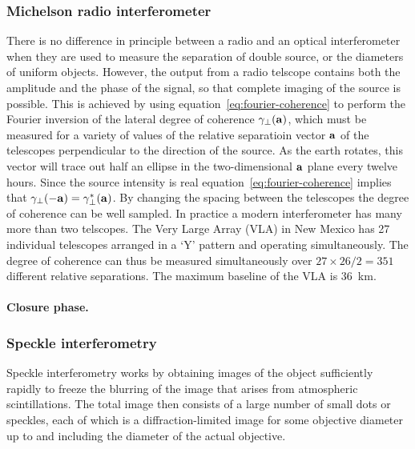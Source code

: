 \subsubsection{Michelson radio interferometer}

There is no difference in principle between a radio and an optical interferometer when they are used to measure the separation of double source, or the diameters of uniform objects. However, the output from a radio telscope contains both the amplitude and the phase of the signal, so that complete imaging of the source is possible. This is achieved by using equation~\ref{eq:fourier-coherence} to perform the Fourier inversion of the lateral degree of coherence $\gamma_\perp({\bf a})$, which must be measured for a 
variety of values of the relative separatioin vector ${\bf a}$ of the telescopes perpendicular to the direction of the source. As the earth rotates, this vector will trace out half an ellipse in the two-dimensional ${\bf a}$ plane every twelve hours. Since the source intensity is real equation~\ref{eq:fourier-coherence} implies that $\gamma_\perp(-{\bf a})=\gamma_\perp^*({\bf a})$. By changing the spacing between the telescopes the degree of coherence can be well sampled. In practice a modern interferometer has many more than two telscopes. The Very Large Array (VLA) in New Mexico has 27 individual telescopes arranged in a `Y' pattern and operating simultaneously. The degree of coherence can thus be measured simultaneously over 
${27\times 26/2}=351$ different relative separations. The maximum baseline of the VLA is 36~km.

\paragraph{Closure phase.}

\subsubsection{Speckle interferometry}

Speckle interferometry works by obtaining images of the object sufficiently rapidly to freeze the blurring of the image that arises from atmospheric scintillations. The total image then consists of a large number of small dots or speckles, each of which is a diffraction-limited image for some objective diameter up to and including the diameter of the actual objective.

